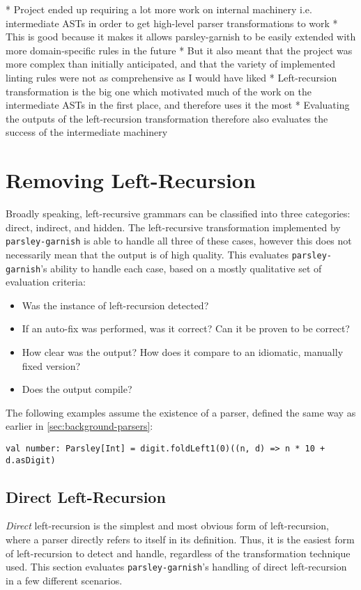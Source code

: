 \documentclass[../../main.tex]{subfiles}
\begin{document}
\label{sec:evaluation}

* Project ended up requiring a lot more work on internal machinery i.e. intermediate ASTs in order to get high-level parser transformations to work
* This is good because it makes it allows parsley-garnish to be easily extended with more domain-specific rules in the future
* But it also meant that the project was more complex than initially anticipated, and that the variety of implemented linting rules were not as comprehensive as I would have liked
* Left-recursion transformation is the big one which motivated much of the work on the intermediate ASTs in the first place, and therefore uses it the most
* Evaluating the outputs of the left-recursion transformation therefore also evaluates the success of the intermediate machinery

\section{Removing Left-Recursion}\label{sec:eval-leftrec}
Broadly speaking, left-recursive grammars can be classified into three categories: direct, indirect, and hidden.
The left-recursive transformation implemented by \texttt{parsley-garnish} is able to handle all three of these cases, however this does not necessarily mean that the output is of high quality.
This  evaluates \texttt{parsley-garnish}'s ability to handle each case, based on a mostly qualitative set of evaluation criteria:
\begin{itemize}
  \item Was the instance of left-recursion detected?
  \item If an auto-fix was performed, was it correct? Can it be proven to be correct?
  \item How clear was the output? How does it compare to an idiomatic, manually fixed version?
  \item Does the output compile?
\end{itemize}
%
The following examples assume the existence of a  parser, defined the same way as earlier in \cref{sec:background-parsers}:
\begin{verbatim}
val number: Parsley[Int] = digit.foldLeft1(0)((n, d) => n * 10 + d.asDigit)
\end{verbatim}

\subsection{Direct Left-Recursion}
\emph{Direct} left-recursion is the simplest and most obvious form of left-recursion, where a parser directly refers to itself in its definition.
Thus, it is the easiest form of left-recursion to detect and handle, regardless of the transformation technique used.
This section evaluates \texttt{parsley-garnish}'s handling of direct left-recursion in a few different scenarios.
\end{document}
